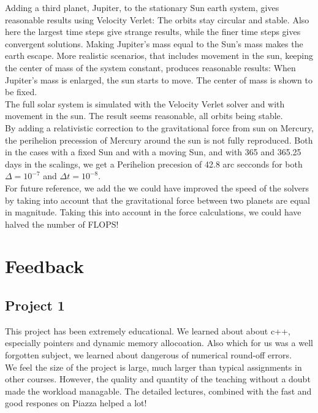 \documentclass{article}
\begin{document}
Adding a third planet, Jupiter, to the stationary Sun earth system, gives reasonable results using Velocity Verlet: The orbits stay circular and stable. Also here the largest time steps give strange results, while the finer time steps gives convergent solutions. Making Jupiter's mass equal to the Sun's mass makes the earth escape. More realistic scenarios, that includes movement in the sun, keeping the center of mass of the system constant, produces reasonable results: When Jupiter's mass is enlarged, the sun starts to move. The center of mass is shown to be fixed.\\

The full solar system is simulated with the Velocity Verlet solver and with movement in the sun. The result seems reasonable, all orbits being stable.\\

By adding a relativistic correction to the gravitational force from sun on Mercury, the perihelion precession of Mercury around the sun is not fully reproduced. Both in the cases with a fixed Sun and with a moving Sun, and with 365 and 365.25 days in the scalings, we get a Perihelion precesion of 42.8 arc secconds for both $\Delta = 10^{-7}$ and $\Delta t = 10^{-8}$. \\

For future reference, we add the we could have improved the speed of the solvers by taking into account that the gravitational force between two planets are equal in magnitude. Taking this into account in the force calculations, we could have halved the number of FLOPS!


\section{Feedback}
\subsection{Project 1}
This project has been extremely educational. We learned about about c++, especially pointers and dynamic memory allocoation. Also which for us was a well forgotten subject, we learned about dangerous of numerical round-off errors. \\

We feel the size of the project is large, much larger than typical assignments in other courses. However, the quality and quantity of the teaching without a doubt made the workload managable. The detailed lectures, combined with the fast and good respones on Piazza helped a lot!\\
\end{document}
